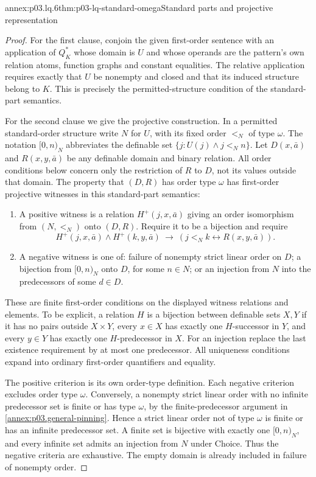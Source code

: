 \begin{annexitem}{annex:p03.lq.6}{thm:p03-lq-standard-omega}{Standard parts and projective representation}
\begin{proof}
For the first clause, conjoin the given first-order sentence with
an application of \(Q_K^*\) whose domain is \(U\) and whose
operands are the pattern's own relation atoms, function graphs
and constant equalities. The relative application requires exactly
that \(U\) be nonempty and closed and that its induced structure
belong to \(K\). This is precisely the permitted-structure
condition of the standard-part semantics.

For the second clause we give the projective construction. In a
permitted standard-order structure write \(N\) for \(U\), with
its fixed order \(<_N\) of type \(\omega\). The notation
\([0,n)_N\) abbreviates the definable set
\(\{j:U(j)\land j<_N n\}\). Let \(D(x,\bar a)\) and
\(R(x,y,\bar a)\) be any definable domain and binary relation.
All order conditions below concern only the restriction of \(R\)
to \(D\), not its values outside that domain.
The property that \((D,R)\) has order type \(\omega\) has
first-order projective witnesses in this standard-part semantics:
\begin{enumerate}
 \item A positive witness is a relation \(H^+(j,x,\bar a)\)
       giving an order isomorphism from \((N,<_N)\) onto \((D,R)\).
       Require it to be a bijection and require
       \[
       H^+(j,x,\bar a)\land H^+(k,y,\bar a)
          \ \longrightarrow\
       (j<_N k\leftrightarrow R(x,y,\bar a)).
       \]
 \item A negative witness is one of: failure of nonempty strict
       linear order on \(D\); a bijection from \([0,n)_N\)
       onto \(D\), for some \(n\in N\); or an injection from
       \(N\) into the predecessors of some \(d\in D\).
\end{enumerate}
These are finite first-order conditions on the displayed witness
relations and elements. To be explicit, a relation \(H\) is a
bijection between definable sets \(X,Y\) if it has no pairs outside
\(X\times Y\), every \(x\in X\) has exactly one \(H\)-successor
in \(Y\), and every \(y\in Y\) has exactly one \(H\)-predecessor
in \(X\). For an injection replace the last existence requirement
by at most one predecessor. All uniqueness conditions expand into
ordinary first-order quantifiers and equality.

The positive criterion is its own order-type definition. Each
negative criterion excludes order type \(\omega\). Conversely,
a nonempty strict linear order with no infinite predecessor set
is finite or has type \(\omega\), by the finite-predecessor
argument in \cref{annex:p03.general-pinning}. Hence a strict
linear order not of type \(\omega\) is finite or has an infinite
predecessor set. A finite set is bijective with exactly one
\([0,n)_N\), and every infinite set admits an injection from
\(N\) under Choice. Thus the negative criteria are exhaustive.
The empty domain is already included in failure of nonempty order.


\end{proof}
\end{annexitem}
